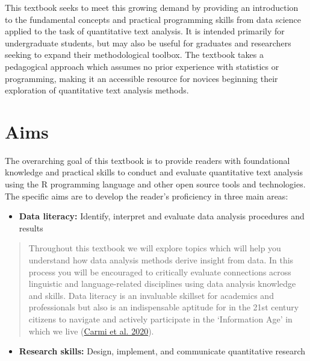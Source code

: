 \documentclass[
  letterpaper,
  DIV=11,
  numbers=noendperiod]{scrreport}
\providecommand{\tightlist}{%
  \setlength{\itemsep}{0pt}\setlength{\parskip}{0pt}}\usepackage{longtable,booktabs,array}
\theoremstyle{definition}
\theoremstyle{remark}
\begin{document}
This textbook seeks to meet this growing demand by providing an
introduction to the fundamental concepts and practical programming
skills from data science applied to the task of quantitative text
analysis. It is intended primarily for undergraduate students, but may
also be useful for graduates and researchers seeking to expand their
methodological toolbox. The textbook takes a pedagogical approach which
assumes no prior experience with statistics or programming, making it an
accessible resource for novices beginning their exploration of
quantitative text analysis methods.

\hypertarget{sec-p-aims}{%
\section*{Aims}\label{sec-p-aims}}


The overarching goal of this textbook is to provide readers with
foundational knowledge and practical skills to conduct and evaluate
quantitative text analysis using the R programming language and other
open source tools and technologies. The specific aims are to develop the
reader's proficiency in three main areas:

\begin{itemize}
\tightlist
\item
  \textbf{Data literacy:} Identify, interpret and evaluate data analysis
  procedures and results
\end{itemize}

\begin{quote}
Throughout this textbook we will explore topics which will help you
understand how data analysis methods derive insight from data. In this
process you will be encouraged to critically evaluate connections across
linguistic and language-related disciplines using data analysis
knowledge and skills. Data literacy is an invaluable skillset for
academics and professionals but also is an indispensable aptitude for in
the 21st century citizens to navigate and actively participate in the
`Information Age' in which we live
(\protect\hyperlink{ref-Carmi2020}{Carmi et al. 2020}).
\end{quote}

\begin{itemize}
\tightlist
\item
  \textbf{Research skills:} Design, implement, and communicate
  quantitative research
\end{itemize}
\end{document}

